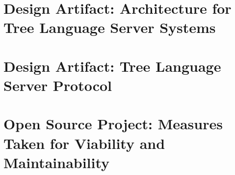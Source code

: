 


\section{Design Artifact: Architecture for Tree Language Server Systems}




\section{Design Artifact: Tree Language Server Protocol}\label{sec:tlsp}




\section{Open Source Project: Measures Taken for Viability and Maintainability}


